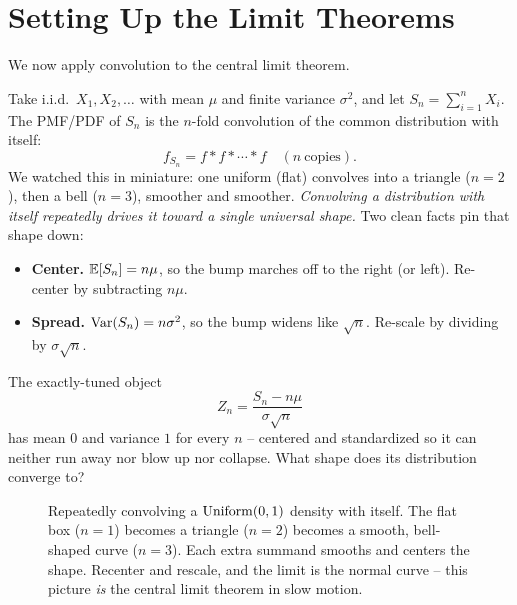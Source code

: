 \section{Setting Up the Limit Theorems}
\label{ch17:limit-setup}

We now apply convolution to the central limit theorem.

\begin{intuitionbox}
Take i.i.d.\ $X_1,X_2,\dots$ with mean $\mu$ and finite variance
$\sigma^2$, and let $S_n=\sum_{i=1}^n X_i$. The PMF/PDF of $S_n$ is the
$n$-fold convolution of the common distribution with itself:
\[
f_{S_n} = f * f * \cdots * f \quad (n\ \text{copies}).
\]
We watched this in miniature: one uniform (flat) convolves into a triangle
($n{=}2$), then a bell ($n{=}3$), smoother and smoother. \emph{Convolving
a distribution with itself repeatedly drives it toward a single universal
shape.} Two clean facts pin that shape down:
\begin{itemize}
  \item \textbf{Center.} $\operatorname{\mathbb{E}}[S_n]=n\mu$, so the bump marches off to the
        right (or left). Re-center by subtracting $n\mu$.
  \item \textbf{Spread.} $\operatorname{Var}(S_n)=n\sigma^2$, so the bump widens like
        $\sqrt n$. Re-scale by dividing by $\sigma\sqrt n$.
\end{itemize}
The exactly-tuned object
\[
Z_n=\frac{S_n-n\mu}{\sigma\sqrt n}
\]
has mean $0$ and variance $1$ for every $n$ -- centered and standardized
so it can neither run away nor blow up nor collapse. What shape does its
distribution converge to?
\end{intuitionbox}

\begin{figure}[H]
\centering
{}
\caption{Repeatedly convolving a $\operatorname{Uniform}(0,1)$ density with itself. The flat
box ($n{=}1$) becomes a triangle ($n{=}2$) becomes a smooth, bell-shaped
curve ($n{=}3$). Each extra summand smooths and centers the shape. Recenter
and rescale, and the limit is the normal curve -- this picture \emph{is}
the central limit theorem in slow motion.}
\label{ch17:fig-clt}
\end{figure}

